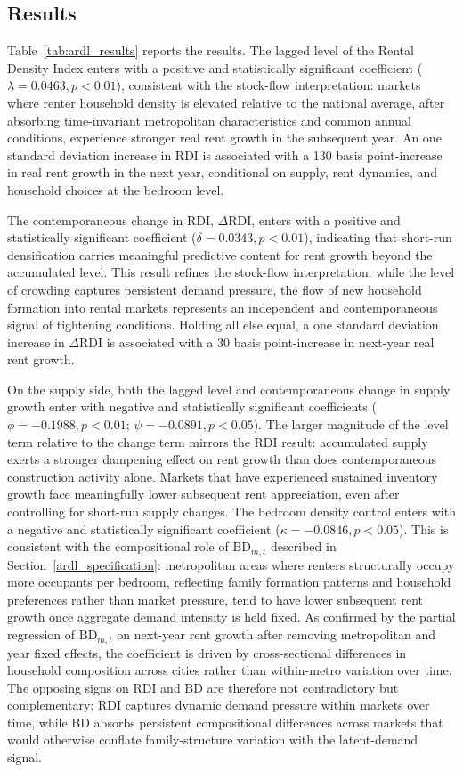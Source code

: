 \documentclass[pdflatex,sn-apa]{sn-jnl}%
\theoremstyle{thmstyleone}%
\theoremstyle{thmstyletwo}%
\theoremstyle{thmstylethree}%
\begin{document}
\subsection{Results}

Table~\ref{tab:ardl_results} reports the results. The lagged level of the Rental Density 
Index enters with a positive and statistically significant coefficient 
($\lambda = 0.0463, p < 0.01$), consistent with the stock-flow interpretation: 
markets where renter household density is elevated relative to the national 
average, after absorbing time-invariant metropolitan characteristics and common 
annual conditions, experience stronger real rent growth in the subsequent year. 
An one standard deviation increase in RDI is associated with a 130 basis point-increase in real rent growth in the next year, conditional on supply, rent dynamics, and household choices at
the bedroom level.

The contemporaneous change in RDI, $\Delta\text{RDI}$, enters with a positive 
and statistically significant coefficient ($\delta = 0.0343, p < 0.01$), 
indicating that short-run densification carries meaningful predictive content for 
rent growth beyond the accumulated level. This result refines the stock-flow 
interpretation: while the level of crowding captures persistent demand pressure, 
the flow of new household formation into rental markets represents an independent 
and contemporaneous signal of tightening conditions. Holding all else equal, a one standard deviation increase in $\Delta\text{RDI}$ is associated with a 30 basis point-increase in next-year real rent growth.

On the supply side, both the lagged level and contemporaneous change in supply 
growth enter with negative and statistically significant coefficients 
($\phi = -0.1988, p < 0.01$; $\psi = -0.0891, p < 0.05$). The larger magnitude 
of the level term relative to the change term mirrors the RDI result: accumulated 
supply exerts a stronger dampening effect on rent growth than does contemporaneous 
construction activity alone. Markets that have experienced sustained inventory 
growth face meaningfully lower subsequent rent appreciation, even after controlling 
for short-run supply changes.
The bedroom density control enters with a negative and statistically significant
coefficient ($\kappa = -0.0846, p < 0.05$). This is consistent with the
compositional role of $\text{BD}_{m,t}$ described in
Section~\ref{ardl_specification}: metropolitan areas where renters structurally
occupy more occupants per bedroom, reflecting family formation patterns and
household preferences rather than market pressure, tend to have lower subsequent
rent growth once aggregate demand intensity is held fixed. As confirmed by the
partial regression of $\text{BD}_{m,t}$ on next-year rent growth after removing
metropolitan and year fixed effects, the coefficient is driven by cross-sectional
differences in household composition across cities rather than within-metro
variation over time. The opposing signs on RDI and BD are therefore not
contradictory but complementary: RDI captures dynamic demand pressure within
markets over time, while BD absorbs persistent compositional differences across
markets that would otherwise conflate family-structure variation with the
latent-demand signal.
\end{document}

